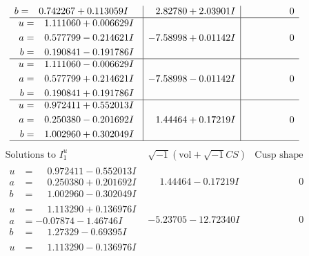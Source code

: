 \documentclass[1p]{elsarticle_modified}
\theoremstyle{definition}
\newcommand{\I}{\sqrt{-1}}
\begin{document}
$$\begin{array}{c|c|c}
\begin{aligned}
b &= \phantom{-}0.742267 + 0.113059 I\end{aligned}
 & \phantom{-}2.82780 + 2.03901 I & \phantom{-0.000000 } 0 \\ \hline\begin{aligned}
u &= \phantom{-}1.111060 + 0.006629 I \\
a &= \phantom{-}0.577799 - 0.214621 I \\
b &= \phantom{-}0.190841 - 0.191786 I\end{aligned}
 & -7.58998 + 0.01142 I & \phantom{-0.000000 } 0 \\ \hline\begin{aligned}
u &= \phantom{-}1.111060 - 0.006629 I \\
a &= \phantom{-}0.577799 + 0.214621 I \\
b &= \phantom{-}0.190841 + 0.191786 I\end{aligned}
 & -7.58998 - 0.01142 I & \phantom{-0.000000 } 0 \\ \hline\begin{aligned}
u &= \phantom{-}0.972411 + 0.552013 I \\
a &= \phantom{-}0.250380 - 0.201692 I \\
b &= \phantom{-}1.002960 + 0.302049 I\end{aligned}
 & \phantom{-}1.44464 + 0.17219 I & \phantom{-0.000000 } 0\\
 \hline 
 \end{array}$$\newpage$$\begin{array}{c|c|c}  
\text{Solutions to }I^u_{1}& \I (\text{vol} + \sqrt{-1}CS) & \text{Cusp shape}\\
 \hline 
\begin{aligned}
u &= \phantom{-}0.972411 - 0.552013 I \\
a &= \phantom{-}0.250380 + 0.201692 I \\
b &= \phantom{-}1.002960 - 0.302049 I\end{aligned}
 & \phantom{-}1.44464 - 0.17219 I & \phantom{-0.000000 } 0 \\ \hline\begin{aligned}
u &= \phantom{-}1.113290 + 0.136976 I \\
a &= -0.07874 - 1.46746 I \\
b &= \phantom{-}1.27329 - 0.69395 I\end{aligned}
 & -5.23705 - 12.72340 I & \phantom{-0.000000 } 0 \\ \hline\begin{aligned}
u &= \phantom{-}1.113290 - 0.136976 I \\

\end{aligned}
\end{array}$$
\end{document}
